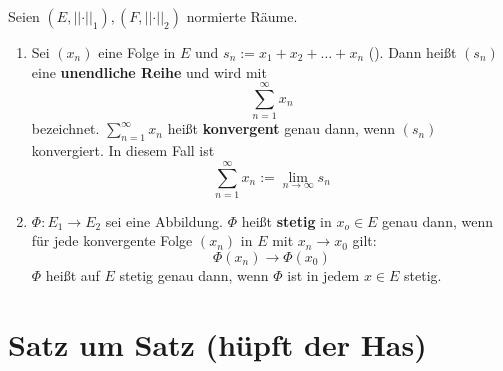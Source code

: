 \documentclass[a4paper,twoside,DIV15,BCOR12mm,chapterprefix=true,headings=onelinechapter]{scrbook}
\begin{document}
\begin{definition}
Seien \((E,\lvert\lvert\cdot\rvert\rvert_1), (F,\lvert\lvert\cdot\rvert\rvert_2)\) normierte Räume.
\begin{enumerate}
\item 	Sei \((x_n)\) eine Folge in $E$ und \(s_n:=x_1+x_2+\ldots+x_n\) (\natn).
 		Dann heißt \((s_n)\) eine \textbf{unendliche Reihe} und wird mit
		\[\sum^\infty_{n=1}x_n\] bezeichnet. \(\sum^\infty_{n=1}x_n\) heißt
		\textbf{konvergent} genau dann, wenn \((s_n)\) konvergiert. In diesem Fall ist
		\[\sum^\infty_{n=1}x_n:=\lim_{n\to\infty}s_n\]
\item 	\(\Phi\colon E_1\to E_2\) sei eine Abbildung. \(\Phi\) heißt \textbf{stetig} in \(x_o\in E\)
		genau dann, wenn für jede konvergente Folge \((x_n)\) in $E$ mit \(x_n\to x_0\)
		gilt: \[\Phi(x_n)\to\Phi(x_0)\] 
		\(\Phi\) heißt auf $E$ stetig genau dann, wenn \(\Phi\) ist in jedem \(x\in E\) stetig.
\end{enumerate}
\end{definition}

\appendix
\chapter{Satz um Satz (hüpft der Has)}

\renewcommand{\indexname}{Stichwortverzeichnis}
\printindex
\end{document}

